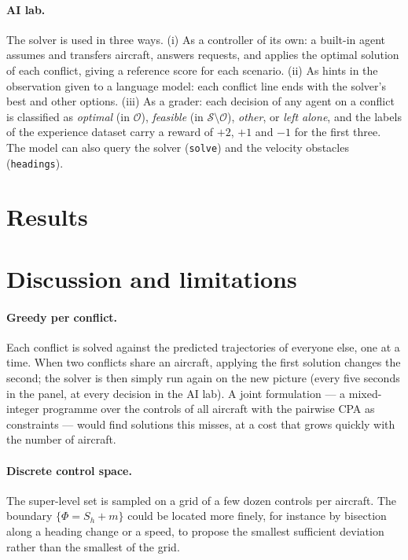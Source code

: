 \documentclass[11pt,a4paper]{article}
\newcommand{\Sh}{S_h}
\begin{document}
\paragraph{AI lab.} The solver is used in three ways. (i) As a controller of its own: a built-in agent assumes and
transfers aircraft, answers requests, and applies the optimal solution of each conflict, giving a reference score
for each scenario. (ii) As hints in the observation given to a language model: each conflict line ends with the
solver's best and other options. (iii) As a grader: each decision of any agent on a conflict is classified as
\emph{optimal} (in $\mathcal O$), \emph{feasible} (in $\mathcal S\setminus\mathcal O$), \emph{other}, or
\emph{left alone}, and the labels of the experience dataset carry a reward of $+2$, $+1$ and $-1$ for the first
three. The model can also query the solver (\texttt{solve}) and the velocity obstacles (\texttt{headings}).

\section{Results}\label{sec:results}


\section{Discussion and limitations}\label{sec:discussion}

\paragraph{Greedy per conflict.} Each conflict is solved against the predicted trajectories of everyone else, one
at a time. When two conflicts share an aircraft, applying the first solution changes the second; the solver is then
simply run again on the new picture (every five seconds in the panel, at every decision in the AI lab). A joint
formulation --- a mixed-integer programme over the controls of all aircraft with the pairwise CPA as constraints ---
would find solutions this misses, at a cost that grows quickly with the number of aircraft.

\paragraph{Discrete control space.} The super-level set is sampled on a grid of a few dozen controls per
aircraft. The boundary $\{\Phi=\Sh+m\}$ could be located more finely, for instance by bisection along a heading
change or a speed, to propose the smallest sufficient deviation rather than the smallest of the grid.
\end{document}
